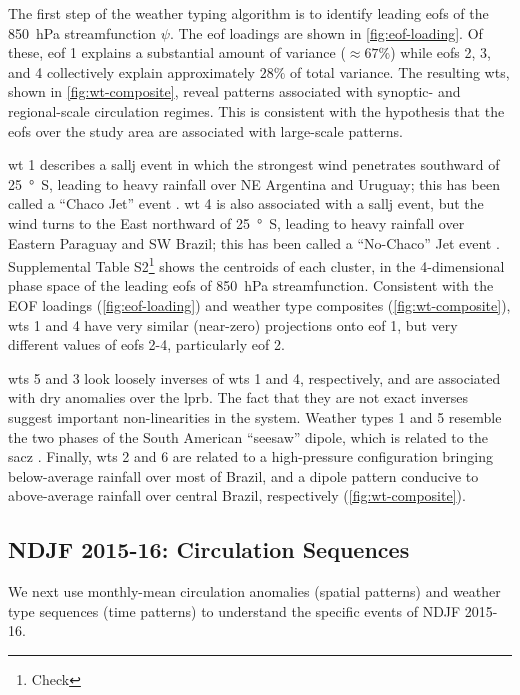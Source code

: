\documentclass[twocol]{ametsoc}
\begin{document}
The first step of the weather typing algorithm is to identify leading \glspl{eof} of the \SI{850}{\hecto\pascal} streamfunction $\psi$.
The \gls{eof} loadings are shown in \cref{fig:eof-loading}.
Of these, \gls{eof} 1 explains a substantial amount of variance ($\approx 67\%$) while \glspl{eof} 2, 3, and 4 collectively explain approximately $28\%$ of total variance.
The resulting \glspl{wt}, shown in \cref{fig:wt-composite}, reveal patterns associated with synoptic- and regional-scale circulation regimes.
This is consistent with the hypothesis that the \glspl{eof} over the study area are associated with large-scale patterns.

\Gls{wt} 1 describes a \gls{sallj} event in which the strongest wind penetrates southward of \SI{25}{\degree S}, leading to heavy rainfall over NE Argentina and Uruguay; this has been called a ``Chaco Jet'' event \citep{Salio2002}.
\Gls{wt} 4 is also associated with a \gls{sallj} event, but the wind turns to the East northward of \SI{25}{\degree S}, leading to heavy rainfall over Eastern Paraguay and SW Brazil; this has been called a ``No-Chaco'' Jet event \citep{Vera2006}.
Supplemental Table S2\footnote{Check} shows the centroids of each cluster, in the 4-dimensional phase space of the leading \glspl{eof} of \SI{850}{\hecto\pascal} streamfunction.
Consistent with the EOF loadings (\cref{fig:eof-loading}) and weather type composites (\cref{fig:wt-composite}), \glspl{wt} 1 and 4 have very similar (near-zero) projections onto \gls{eof} 1, but very different values of \glspl{eof} 2-4, particularly \gls{eof} 2.

\Glspl{wt} 5 and 3 look loosely inverses of \glspl{wt} 1 and 4, respectively, and are associated with dry anomalies over the \gls{lprb}.
The fact that they are not exact inverses suggest important non-linearities in the system.
Weather types 1 and 5 resemble the two phases of the South American ``seesaw'' dipole, which is related to the \gls{sacz} \citep{Nogues-Paegle1997}.
Finally, \glspl{wt} 2 and 6 are related to a high-pressure configuration bringing below-average rainfall over most of Brazil, and a dipole pattern conducive to above-average rainfall over central Brazil, respectively (\cref{fig:wt-composite}).

\subsection{NDJF 2015-16: Circulation Sequences}

We next use monthly-mean circulation anomalies (spatial patterns) and weather type sequences (time patterns) to understand the specific events of NDJF 2015-16.
\end{document}
